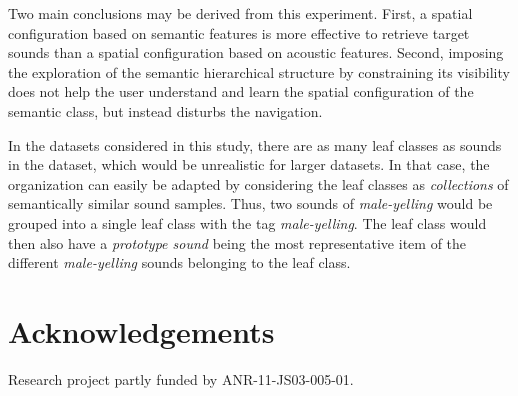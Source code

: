 \documentclass{aes2e}
\begin{document}
Two main conclusions may be derived from this experiment. First, a spatial configuration based on semantic features is more effective to retrieve target sounds than a spatial configuration based on acoustic features. Second, imposing the exploration of the semantic hierarchical structure by constraining its visibility does not help the user understand and learn the spatial configuration of the semantic class, but instead disturbs the navigation. 

In the datasets considered in this study, there are as many leaf classes as sounds in the dataset, which would be unrealistic for larger datasets. In that case, the organization can easily be adapted by considering the leaf classes as \textit{collections} of semantically similar sound samples. Thus, two sounds of \textit{male-yelling} would be grouped into a single leaf class with the tag \textit{male-yelling}. The leaf class would then also have a \textit{prototype sound} being the most representative item of the different \textit{male-yelling} sounds belonging to the leaf class.

%


\section{Acknowledgements}

Research project partly funded by ANR-11-JS03-005-01.





%
%
\end{document}

